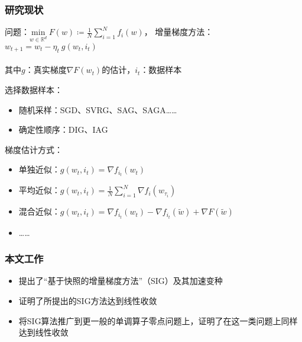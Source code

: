 \frame
{
\frametitle{研究现状}
\footnotesize
问题：$\underset{w \in \mathbb{R}^d}{\text{min}} \ F(w) \coloneqq \frac{1}{N} \sum_{i=1}^N f_i(w) $， \pause 增量梯度方法：$w_{t+1} = w_t - \eta_t \ g(w_t, i_t)$ \\~\\
\pause 其中$g$：真实梯度$\nabla F(w_t)$的估计，$i_t$：数据样本

\pause

\begin{block}{}
选择数据样本：
\begin{itemize}
    \item 随机采样：SGD、SVRG、SAG、SAGA……
    \item 确定性顺序：DIG、IAG
\end{itemize}
\end{block}

\pause

\begin{block}{}
梯度估计方式：
\begin{itemize}
    \item 单独近似：$g(w_t, i_t) = \nabla f_{i_t}(w_t)$
    \item 平均近似：$g(w_t, i_t) = \frac{1}{N}\sum_{i=1}^N\nabla f_i(w_{\tau_i})$
    \item 混合近似：$g(w_t, i_t) = \nabla f_{i_t}(w_t) - \nabla f_{i_t}(\tilde{w}) + \nabla F(\tilde{w})$
    \item ……
\end{itemize}
\end{block}

}

\frame
{
\frametitle{本文工作}
\begin{itemize}
  \item 提出了“基于快照的增量梯度方法”（SIG）及其加速变种 \vspace*{1em}
  \item 证明了所提出的SIG方法达到线性收敛 \vspace*{1em}
  \item 将SIG算法推广到更一般的单调算子零点问题上，证明了在这一类问题上同样达到线性收敛
\end{itemize}
}

\miniframeson
